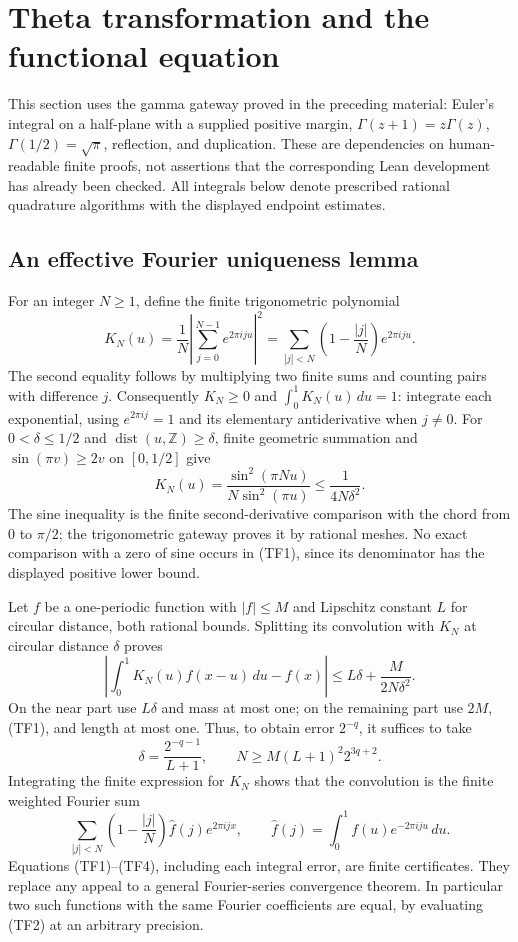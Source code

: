 \section{Theta transformation and the functional equation}
\label{sec:theta-functional}

This section uses the gamma gateway proved in the preceding material:
Euler's integral on a half-plane with a supplied positive margin,
$\Gamma(z+1)=z\Gamma(z)$, $\Gamma(1/2)=\sqrt\pi$, reflection,
and duplication.  These are dependencies on human-readable finite
proofs, not assertions that the corresponding Lean development has
already been checked.  All integrals below denote prescribed rational
quadrature algorithms with the displayed endpoint estimates.

\subsection{An effective Fourier uniqueness lemma}

For an integer $N\ge1$, define the finite trigonometric polynomial
\[
 K_N(u)=\frac1N\left|\sum_{j=0}^{N-1}e^{2\pi iju}\right|^2
       =\sum_{|j|<N}\left(1-\frac{|j|}N\right)e^{2\pi iju}.
\]
The second equality follows by multiplying two finite sums and counting
pairs with difference $j$.  Consequently $K_N\ge0$ and
$\int_0^1K_N(u)\,du=1$: integrate each exponential, using
$e^{2\pi ij}=1$ and its elementary antiderivative when $j\ne0$.
For $0<\delta\le1/2$ and
$\operatorname{dist}(u,\mathbb Z)\ge\delta$, finite geometric summation
and $\sin(\pi v)\ge2v$ on $[0,1/2]$ give
\[
 K_N(u)=\frac{\sin^2(\pi Nu)}{N\sin^2(\pi u)}
             \le\frac1{4N\delta^2}.                 \tag{TF1}
\]
The sine inequality is the finite second-derivative comparison with the
chord from $0$ to $\pi/2$; the trigonometric gateway proves it by rational
meshes.  No exact comparison with a zero of sine occurs in (TF1), since
its denominator has the displayed positive lower bound.

Let $f$ be a one-periodic function with $|f|\le M$ and Lipschitz
constant $L$ for circular distance, both rational bounds.  Splitting
its convolution with $K_N$ at circular distance $\delta$ proves
\[
 \left|\int_0^1K_N(u)f(x-u)\,du-f(x)\right|
       \le L\delta+\frac{M}{2N\delta^2}.             \tag{TF2}
\]
On the near part use $L\delta$ and mass at most one; on the remaining
part use $2M$, (TF1), and length at most one.  Thus, to obtain error
$2^{-q}$, it suffices to take
\[
 \delta=\frac{2^{-q-1}}{L+1},\qquad
 N\ge M(L+1)^2 2^{3q+2}.                             \tag{TF3}
\]
Integrating the finite expression for $K_N$ shows that the convolution
is the finite weighted Fourier sum
\[
 \sum_{|j|<N}\left(1-\frac{|j|}N\right)\widehat f(j)e^{2\pi ijx},
 \qquad \widehat f(j)=\int_0^1f(u)e^{-2\pi iju}\,du.
                                                               \tag{TF4}
\]
Equations (TF1)--(TF4), including each integral error, are finite
certificates.  They replace any appeal to a general Fourier-series
convergence theorem.  In particular two such functions with the same
Fourier coefficients are equal, by evaluating (TF2) at an arbitrary
precision.

